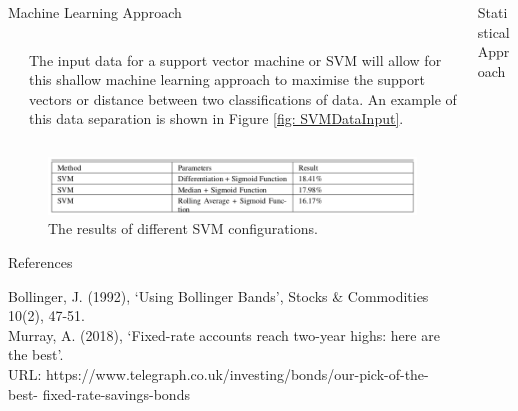 \documentclass[final]{beamer}
\begin{document}
\begin{frame}{}
\begin{columns}[t]
\begin{column}{.48\linewidth}
\begin{block}{Machine Learning Approach}
\begin{columns}[t]
\begin{column}{0.48\linewidth}
         \end{column}
         
         \begin{column}{0.42\linewidth}
         
         The input data for a support vector machine or SVM will allow for this shallow machine learning approach to maximise the support vectors or distance between two classifications of data. An example of this data separation is shown in Figure \ref{fig: SVMDataInput}. 
         
         \end{column}   
         
         \end{columns}
		
		\begin{figure}
         \includegraphics[width=0.8\columnwidth]{table3}
         \caption{The results of different SVM configurations.}
         \label{table: SVM Results}
         \end{figure}
		
		\end{block}


		\begin{block}{References}
		
		\tiny
		Bollinger, J. (1992), `Using Bollinger Bands', Stocks \& Commodities 10(2), 47-51. \\
		Murray, A. (2018), `Fixed-rate accounts reach two-year highs: here are the best'. \\
		URL: https://www.telegraph.co.uk/investing/bonds/our-pick-of-the-best-
fixed-rate-savings-bonds
		
		\end{block}
        

      \end{column}


      \begin{column}{.48\linewidth}
        
        
         \begin{block}{Statistical Approach}
         

\end{block}
\end{column}
\end{columns}
\end{frame}
\end{document}
